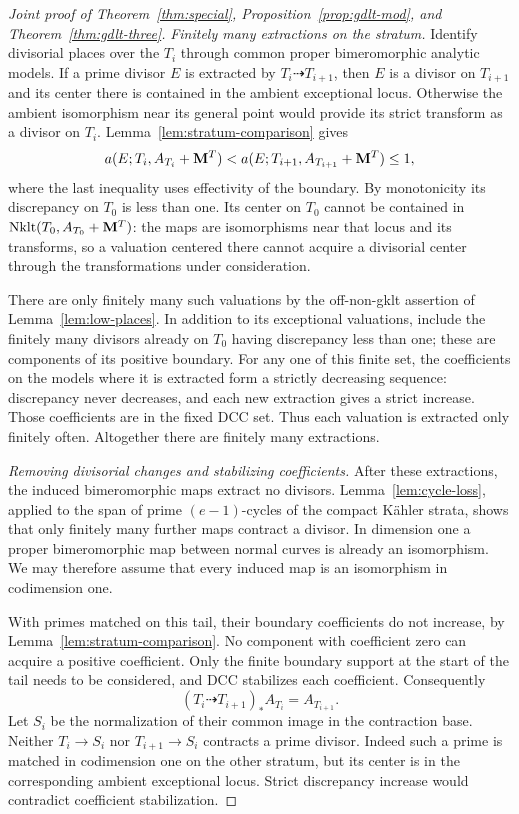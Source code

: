 \begin{proof}[Joint proof of Theorem~\ref{thm:special},
Proposition~\ref{prop:gdlt-mod}, and Theorem~\ref{thm:gdlt-three}]
\smallskip
\noindent\emph{Finitely many extractions on the stratum.}
Identify divisorial places over the $T_i$ through common proper
bimeromorphic analytic models.  If a prime
divisor $E$ is extracted by $T_i\dashrightarrow T_{i+1}$,
then $E$ is a divisor on $T_{i+1}$ and its center there is
contained in the ambient exceptional locus.  Otherwise
the ambient isomorphism near its general point would
provide its strict transform as a divisor on $T_i$.
Lemma~\ref{lem:stratum-comparison} gives
\[
 a(E;T_i,A_{T_i}+\mathbf M^T)
 <a(E;T_{i+1},A_{T_{i+1}}+\mathbf M^T)\leq1,
\]
where the last inequality uses effectivity of the boundary.
By monotonicity its discrepancy on $T_0$ is less than one.
Its center on $T_0$ cannot be contained in
$\operatorname{Nklt}(T_0,A_{T_0}+\mathbf M^T)$: the maps are
isomorphisms near that locus and its transforms, so a
valuation centered there cannot acquire a divisorial
center through the transformations under consideration.

There are only finitely many such valuations by the
off-non-gklt assertion of Lemma~\ref{lem:low-places}.
In addition to its exceptional valuations, include the
finitely many divisors already on $T_0$ having discrepancy
less than one; these are components of its positive
boundary.  For any one of this finite set, the coefficients
on the models where it is extracted form a strictly
decreasing sequence: discrepancy never decreases, and
each new extraction gives a strict increase.  Those
coefficients are in the fixed DCC set.  Thus each
valuation is extracted only finitely often.  Altogether
there are finitely many extractions.

\smallskip
\noindent\emph{Removing divisorial changes and stabilizing coefficients.}
After these extractions, the induced bimeromorphic maps
extract no divisors.  Lemma~\ref{lem:cycle-loss}, applied
to the span of prime $(e-1)$-cycles of the compact
K\"ahler strata, shows that only finitely many further
maps contract a divisor.  In dimension one a proper
bimeromorphic map between normal curves is already an
isomorphism.  We may therefore assume that every induced
map is an isomorphism in codimension one.

With primes matched on this tail, their boundary
coefficients do not increase, by
Lemma~\ref{lem:stratum-comparison}.  No component with
coefficient zero can acquire a positive coefficient.
Only the finite boundary support at the start of the
tail needs to be considered, and DCC stabilizes each
coefficient.  Consequently
\[
 (T_i\dashrightarrow T_{i+1})_*A_{T_i}=A_{T_{i+1}}.
\]
Let $S_i$ be the normalization of their common image in
the contraction base.  Neither $T_i\to S_i$ nor
$T_{i+1}\to S_i$ contracts a prime divisor.  Indeed such
a prime is matched in codimension one on the other
stratum, but its center is in the corresponding ambient
exceptional locus.  Strict discrepancy increase would
contradict coefficient stabilization.


\end{proof}
